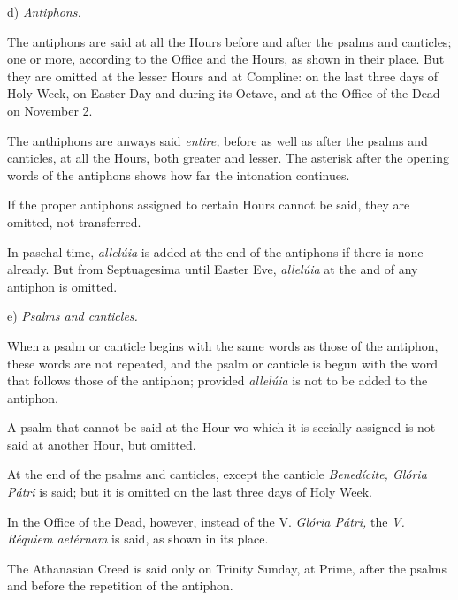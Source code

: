 d) {\it Antiphons.}

The antiphons are said at all the Hours before and after the psalms and canticles; one or more, according to the Office and the Hours, as shown in their place. But they are omitted at the lesser Hours and at Compline: on the last three days of Holy Week, on Easter Day and during its Octave, and at the Office of the Dead on November 2.

The anthiphons are anways said {\it entire,} before as well as after the psalms and canticles, at all the Hours, both greater and lesser. The asterisk after the opening words of the antiphons shows how far the intonation continues.

If the proper antiphons assigned to certain Hours cannot be said, they are omitted, not transferred.

In paschal time, {\it allelúia} is added at the end of the antiphons if there is none already. But from Septuagesima until Easter Eve, {\it allelúia} at the and of any antiphon is omitted.

e) {\it Psalms and canticles.}

When a psalm or canticle begins with the same words as those of the antiphon, these words are not repeated, and the psalm or canticle is begun with the word that follows those of the antiphon; provided {\it allelúia} is not to be added to the antiphon.

A psalm that cannot be said at the Hour wo which it is secially assigned is not said at another Hour, but omitted.

At the end of the psalms and canticles, except the canticle {\it Benedícite, Glória Pátri} is said; but it is omitted on the last three days of Holy Week.

In the Office of the Dead, however, instead of the V. {\it Glória Pátri,} the {\it V. Réquiem aetérnam} is said, as shown in its place.

The Athanasian Creed is said only on Trinity Sunday, at Prime, after the psalms and before the repetition of the antiphon.




